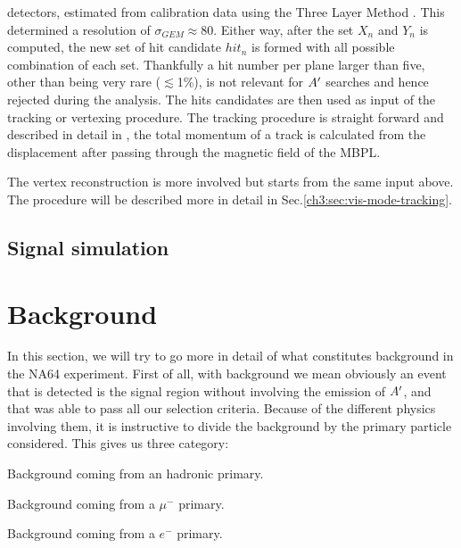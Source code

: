 detectors, estimated from calibration data using the Three Layer Method \cite{Bortfeldt:2014vvt}. This determined a resolution of $\sigma_{GEM} \approx 80$\mum. Either way, after the set $X_n$ and $Y_n$ is computed, the new set of hit candidate $hit_n$ is formed with all possible combination of each set. Thankfully a hit number per plane larger than five, other than being very rare ($\lesssim$1\%), is not relevant for $A'$ searches and hence rejected during the analysis. The hits candidates are then used as input of the tracking or vertexing procedure. The tracking procedure is straight forward and described in detail in \cite{dbanerjee-thesis}, the total momentum of a track is calculated from the displacement after passing through the magnetic field of the MBPL.



The vertex reconstruction is more involved but starts from the same input above. The procedure will be described more in detail in Sec.\ref{ch3:sec:vis-mode-tracking}.

\subsection{Signal simulation}
\label{ch3:sec:geant4-signal}

\section{Background}
\label{ch3:sec:bkg}

In this section, we will try to go more in detail of what constitutes background in the NA64 experiment. First of all, with background we mean obviously an event that is detected is the signal region without involving the emission of $A'$, and that was able to pass all our selection criteria. Because of the different physics involving them, it is instructive to divide the background by the primary particle considered. This gives us three category:

\begin{description}[leftmargin=!,labelwidth=\widthof{\bfseries Electronic background}]
\item[Hadronic background] Background coming from an hadronic primary.
\item[Muonic background] Background coming from a $\mu^-$ primary.
\item[Electronic background] Background coming from a $e^-$ primary.
\end{description}


